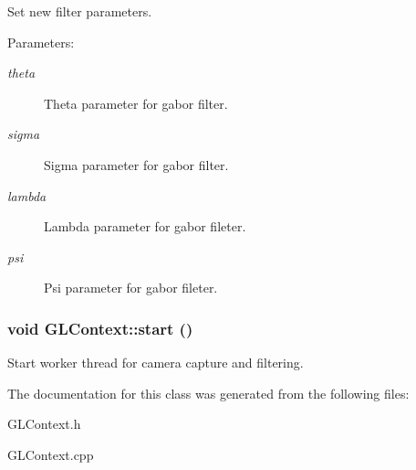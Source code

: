 Set new filter parameters. \begin{Desc}
\item[Parameters:]
\begin{description}
\item[{\em theta}]Theta parameter for gabor filter. \item[{\em sigma}]Sigma parameter for gabor filter. \item[{\em lambda}]Lambda parameter for gabor fileter. \item[{\em psi}]Psi parameter for gabor fileter. \end{description}
\end{Desc}
\hypertarget{classGLContext_5e59aaa40eef13416aea345fbd3a18d9}{
\subsubsection[{start}]{\setlength{\rightskip}{0pt plus 5cm}void GLContext::start ()}}
\label{classGLContext_5e59aaa40eef13416aea345fbd3a18d9}


Start worker thread for camera capture and filtering. 

The documentation for this class was generated from the following files:\begin{CompactItemize}
\item 
GLContext.h\item 
GLContext.cpp\end{CompactItemize}
